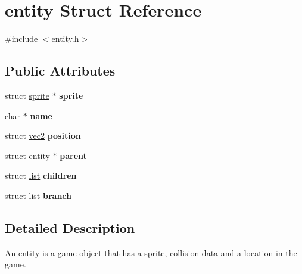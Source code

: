 \hypertarget{structentity}{\section{entity Struct Reference}
\label{structentity}
}


{\ttfamily \#include $<$entity.\-h$>$}

\subsection*{Public Attributes}
\begin{DoxyCompactItemize}
\item 
\hypertarget{structentity_ad84926421be196f090af459f080cf1c9}{struct \hyperlink{structsprite}{sprite} $\ast$ {\bfseries sprite}}\label{structentity_ad84926421be196f090af459f080cf1c9}

\item 
\hypertarget{structentity_a69542ac90f210caa0904728e83446602}{char $\ast$ {\bfseries name}}\label{structentity_a69542ac90f210caa0904728e83446602}

\item 
\hypertarget{structentity_ae946379f1bae46e43d1141cee5e0b7e4}{struct \hyperlink{structvec2}{vec2} {\bfseries position}}\label{structentity_ae946379f1bae46e43d1141cee5e0b7e4}

\item 
\hypertarget{structentity_aa6d9285528547d69b3137b49299bb7c5}{struct \hyperlink{structentity}{entity} $\ast$ {\bfseries parent}}\label{structentity_aa6d9285528547d69b3137b49299bb7c5}

\item 
\hypertarget{structentity_a8d6e9d1ad9243a6e326de2caa12e2836}{struct \hyperlink{structlist}{list} {\bfseries children}}\label{structentity_a8d6e9d1ad9243a6e326de2caa12e2836}

\item 
\hypertarget{structentity_aeea1689a586e212b705dacfc4fd48931}{struct \hyperlink{structlist}{list} {\bfseries branch}}\label{structentity_aeea1689a586e212b705dacfc4fd48931}

\end{DoxyCompactItemize}


\subsection{Detailed Description}
An entity is a game object that has a sprite, collision data and a location in the game.

